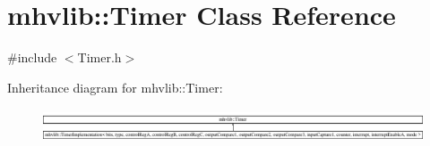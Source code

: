 \hypertarget{classmhvlib_1_1_timer}{\section{mhvlib\-:\-:Timer Class Reference}
\label{classmhvlib_1_1_timer}
}


{\ttfamily \#include $<$Timer.\-h$>$}

Inheritance diagram for mhvlib\-:\-:Timer\-:\begin{figure}[H]
\begin{center}
\leavevmode
\includegraphics[height=0.992028cm]{classmhvlib_1_1_timer}
\end{center}
\end{figure}
